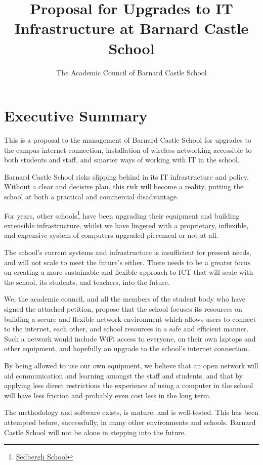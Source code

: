 \documentclass[a4paper,leqno,titlepage]{article}
\title{Proposal for Upgrades to IT Infrastructure at Barnard Castle School}
\author{The Academic Council of Barnard Castle School}
\begin{document}
\maketitle

\section{Executive Summary}

This is a proposal to the management of Barnard Castle School for upgrades
to the campus internet connection,
installation of wireless networking accessible to both students and staff,
and smarter ways of working with IT in the school. 

Barnard Castle School risks slipping behind in its
IT infrastructure and policy.
Without a clear and decisive plan, this risk will become a reality, putting
the school at both a practical and commercial disadvantage.


For years, other schools\footnote{\href{http://www.sedberghschool.org/ict.html}{Sedbergh School}}
have been upgrading their equipment and building extensible infrastructure,
whilst we have lingered with a proprietary, inflexible, and expensive system of
computers upgraded piecemeal or not at all.


The school's current systems and infrastructure is insufficient for present
needs, and will not scale to meet the future's either.
There needs to be a greater focus on creating a more sustainable and flexible
approach to ICT that will scale with the school, its students, and teachers,
into the future.


We, the academic council, and all the members of the student body who have signed
the attached petition, propose that the school focuses its resources on building
a secure and flexible network environment which allows users to connect to the
internet, each other, and school resources in a safe and efficient manner.
Such a network would include WiFi access to everyone, on their own laptops and
other equipment, and hopefully an upgrade to the school's internet connection.


By being allowed to use our own equipment, we believe that an open network will
aid communication and learning amongst the staff and students, and that by
applying less direct restrictions the experience of using a computer in the
school will have less friction and probably even cost less in the long term.


The methodology and software exists, is mature, and is well-tested. This has
been attempted before, successfully, in many other environments and schools.
Barnard Castle School will not be alone in stepping into the future.
\end{document}
